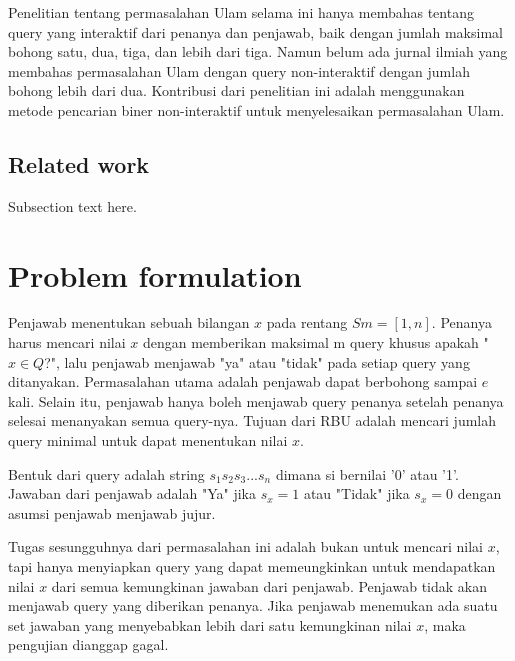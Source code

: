 \documentclass[conference,compsoc]{IEEEtran}
\begin{document}
Penelitian tentang permasalahan Ulam selama ini hanya membahas tentang query yang interaktif dari penanya dan penjawab, baik dengan jumlah maksimal bohong satu, dua, tiga, dan lebih dari tiga. Namun belum ada jurnal ilmiah yang membahas permasalahan Ulam dengan query non-interaktif dengan jumlah bohong lebih dari dua. Kontribusi dari penelitian ini adalah menggunakan metode pencarian biner non-interaktif untuk menyelesaikan permasalahan Ulam.


\subsection{Related work}
Subsection text here.


\section{Problem formulation}

Penjawab menentukan sebuah bilangan $x$ pada rentang $Sm=[1,n]$. Penanya harus mencari nilai $x$ dengan memberikan maksimal m query khusus apakah "$x \in Q$?", lalu penjawab menjawab "ya" atau "tidak" pada setiap query yang ditanyakan. Permasalahan utama adalah penjawab dapat berbohong sampai $e$ kali. Selain itu, penjawab hanya boleh menjawab query penanya setelah penanya selesai menanyakan semua query-nya. Tujuan dari RBU adalah mencari jumlah query minimal untuk dapat menentukan nilai $x$.

Bentuk dari query adalah string $s_1s_2s_3...s_n$ dimana si bernilai '0' atau '1'. Jawaban dari penjawab adalah "Ya" jika $s_x=1$ atau "Tidak" jika $s_x=0$ dengan asumsi penjawab menjawab jujur.

Tugas sesungguhnya dari permasalahan ini adalah bukan untuk mencari nilai $x$, tapi hanya menyiapkan query yang dapat memeungkinkan untuk mendapatkan nilai $x$ dari semua kemungkinan jawaban dari penjawab. Penjawab tidak akan menjawab query yang diberikan penanya. Jika penjawab menemukan ada suatu set jawaban yang menyebabkan lebih dari satu kemungkinan nilai $x$, maka pengujian dianggap gagal.
\end{document}
